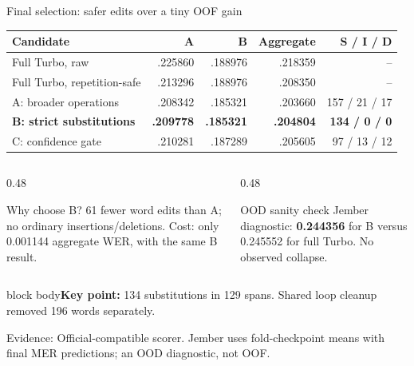 \documentclass[aspectratio=169,11pt]{beamer}
\newcommand{\takeaway}[1]{\vfill\begin{beamercolorbox}[sep=2mm,wd=\linewidth]{block body}\small\textbf{Key point:} #1\end{beamercolorbox}}
\newcommand{\evidence}[1]{\vspace{1mm}\par{\tiny\color{slate}Evidence: #1\par}}
\begin{document}
\begin{frame}{Final selection: safer edits over a tiny OOF gain}
\centering\small
\begin{tabular}{@{}lrrrr@{}}\toprule
\textbf{Candidate}&\textbf{A}&\textbf{B}&\textbf{Aggregate}&\textbf{S / I / D}\\\midrule
Full Turbo, raw&.225860&.188976&.218359&--\\
Full Turbo, repetition-safe&.213296&.188976&.208350&--\\
A: broader operations&.208342&.185321&.203660&157 / 21 / 17\\
\textbf{B: strict substitutions}&\textbf{.209778}&\textbf{.185321}&\textbf{.204804}&\textbf{134 / 0 / 0}\\
C: confidence gate&.210281&.187289&.205605&97 / 13 / 12\\\bottomrule
\end{tabular}
\vspace{3mm}
\begin{columns}[T]
\begin{column}{0.48\textwidth}
\begin{block}{Why choose B?}
\small 61 fewer word edits than A; no ordinary insertions/deletions. Cost: only 0.001144 aggregate WER, with the same B result.
\end{block}
\end{column}
\begin{column}{0.48\textwidth}
\begin{block}{OOD sanity check}
\small Jember diagnostic: \textbf{0.244356} for B versus 0.245552 for full Turbo. No observed collapse.
\end{block}
\end{column}
\end{columns}
\takeaway{134 substitutions in 129 spans. Shared loop cleanup removed 196 words separately.}
\evidence{Official-compatible scorer. Jember uses fold-checkpoint means with final MER predictions; an OOD diagnostic, not OOF.}
\end{frame}
\end{document}

